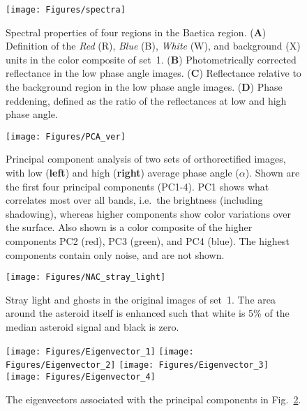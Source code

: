 \documentclass[3p,authoryear]{elsarticle}
\begin{document}
\newpage
\clearpage

\begin{figure}
\centering
\texttt{[image: Figures/spectra]}
\caption{Spectral properties of four regions in the Baetica region. ({\bf A}) Definition of the {\it Red} (R), {\it Blue} (B), {\it White} (W), and background (X) units in the color composite of set~1. ({\bf B}) Photometrically corrected reflectance in the low phase angle images. ({\bf C}) Reflectance relative to the background region in the low phase angle images. ({\bf D}) Phase reddening, defined as the ratio of the reflectances at low and high phase angle.}
\label{fig:spectra}
\end{figure}

\newpage
\clearpage
\thispagestyle{empty}

\begin{figure}
\centering
\texttt{[image: Figures/PCA\_ver]}
\caption{Principal component analysis of two sets of orthorectified images, with low ({\bf left}) and high ({\bf right}) average phase angle ($\alpha$). Shown are the first four principal components (PC1-4). PC1 shows what correlates most over all bands, i.e.\ the brightness (including shadowing), whereas higher components show color variations over the surface. Also shown is a color composite of the higher components PC2 (red), PC3 (green), and PC4 (blue). The highest components contain only noise, and are not shown.}
\label{fig:pca}
\end{figure}

\newpage
\clearpage

\begin{figure}
\centering
\texttt{[image: Figures/NAC\_stray\_light]}
\caption{Stray light and ghosts in the original images of set~1. The area around the asteroid itself is enhanced such that white is 5\% of the median asteroid signal and black is zero.}
\label{fig:stray_light}
\end{figure}

\newpage
\clearpage

\begin{figure}
\centering
\texttt{[image: Figures/Eigenvector\_1]}
\texttt{[image: Figures/Eigenvector\_2]}
\texttt{[image: Figures/Eigenvector\_3]}
\texttt{[image: Figures/Eigenvector\_4]}
\caption{The eigenvectors associated with the principal components in Fig.~\ref{fig:pca}.}
\label{fig:eigenvectors}
\end{figure}
\end{document}
